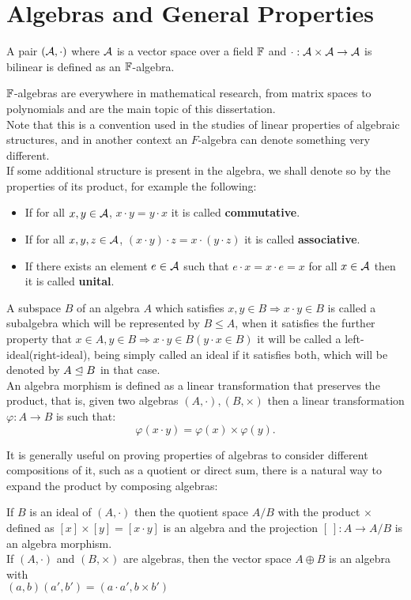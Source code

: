 \section{Algebras and General Properties}
\begin{defi}
	A pair $(\mathcal{A},\cdot)$ where $\mathcal{A}$ is a vector space over a field $\mathbb{F}$ and $\cdot:\mathcal{A}\times\mathcal{A}\rightarrow \mathcal{A}$ is bilinear is defined as an $\mathbb{F}$-algebra.
	\label{genalgebra}
\end{defi}
$\mathbb{F}$-algebras are everywhere in mathematical research, from matrix spaces to polynomials and are the main topic of this dissertation.\\
Note that this is a convention used in the studies of linear properties of algebraic structures, and in another context an $F$-algebra can denote something very different.\\
If some additional structure is present in the algebra, we shall denote so by the properties of its product, for example the following:
\begin{itemize}
	\item If for all $x,y \in \mathcal{A}$, $x\cdot y = y \cdot x$ it is called \textbf{commutative}.
	\item If for all $x,y,z \in \mathcal{A}$, $(x\cdot y)\cdot z = x \cdot(y \cdot z)$ it is called \textbf{associative}.
	\item If there exists an element $e \in \mathcal{A}$ such that $e \cdot x = x \cdot e = x$ for all $x \in \mathcal{A}$ then it is called \textbf{unital}.
\end{itemize}
\begin{defi}
A subspace $B$ of an algebra $A$ which satisfies $x,y \in B \Rightarrow x\cdot y \in B$ is called a subalgebra which will be represented by $B\le A$, when it satisfies the further property that $x \in A, y \in B \Rightarrow x\cdot y \in B(y\cdot x\in B)$ it will be called a left-ideal(right-ideal), being simply called an ideal if it satisfies both, which will be denoted by $A\trianglelefteq B$ in that case.\\
An algebra morphism is defined as a linear transformation that preserves the product, that is, given two algebras $(A,\cdot),(B,\times)$ then a linear transformation $\varphi:A\rightarrow B$ is such that:
$$\varphi(x \cdot y) = \varphi(x) \times \varphi(y).$$
\label{12subalgebra}
\end{defi}
It is generally useful on proving properties of algebras to consider different compositions of it, such as a quotient or direct sum, there is a natural way to expand the product by composing algebras:
\begin{prop}
If $B$ is an ideal of $(A,\cdot)$ then the quotient space $A/B$ with the product $\times$ defined as $[x] \times [y] =  [x\cdot y]$ is an algebra and the projection $[\ ]:A\rightarrow A/B$ is an algebra morphism.\\
If $(A,\cdot)$ and $(B,\times)$ are algebras, then the vector space $A\oplus B$ is an algebra with\\ $(a,b)(a',b')=(a\cdot a',b \times b')$
\label{genquotient}
\end{prop}
